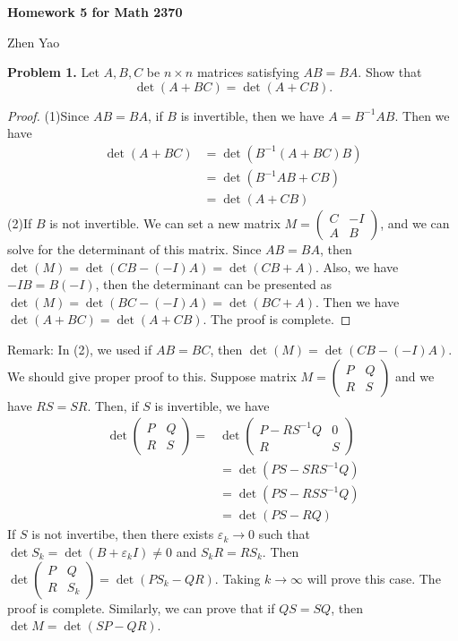 \documentclass[12pt,leqno]{amsart}
\begin{document}
\centerline{\bf Homework 5 for Math 2370}
\centerline{Zhen Yao}

\bigskip

\medskip

\noindent \textbf{Problem 1.} 
Let $A,B,C$ be $n\times n$ matrices satisfying $AB=BA$. Show that
$$
\det\left(  A+BC\right)  =\det\left(  A+CB\right).
$$
\begin{proof}
(1)Since $AB=BA$, if $B$ is invertible, then we have $A=B^{-1}AB$. Then we have
\begin{align*}
    \det (A+BC) &= \det (B^{-1}(A+BC)B) \\
    & = \det(B^{-1}AB+CB) \\
    & = \det(A+CB)
\end{align*}
\hspace*{3em}(2)If $B$ is not invertible. We can set a new matrix $M = \begin{pmatrix}
C & -I \\
A & B
\end{pmatrix}$, and we can solve for the determinant of this matrix. Since $AB=BA$, then $\det(M)=\det(CB-(-I)A)=\det(CB+A)$. Also, we have $-IB=B(-I)$, then the determinant can be presented as $\det (M)=\det(BC-(-I)A)=\det(BC+A)$. Then we have $\det(A+BC)=\det(A+CB)$. The proof is complete.
\end{proof}
\hspace*{2em}Remark: In (2), we used if $AB=BC$, then $\det(M)=\det(CB-(-I)A)$. We should give proper proof to this. Suppose matrix $M = \begin{pmatrix}
P & Q \\
R & S
\end{pmatrix}$ and we have $RS=SR$. Then, if $S$ is invertible, we have 
\begin{align*}
    \det \begin{pmatrix}
    P & Q \\
    R & S
    \end{pmatrix}
    = &\det 
    \begin{pmatrix}
    P-RS^{-1}Q & 0 \\
    R & S
    \end{pmatrix} \\
    & = \det(PS-SRS^{-1}Q) \\
    & = \det(PS-RSS^{-1}Q) \\
    & = \det(PS-RQ)
\end{align*}
If $S$ is not invertibe, then there exists $\varepsilon_k \rightarrow 0$ such that $\det S_k = \det(B+\varepsilon_k I) \neq 0$ and $S_k R = R S_k$. Then $\det \begin{pmatrix}
P & Q \\
R & S_k
\end{pmatrix} = \det (PS_k-QR)$. Taking $k\rightarrow \infty$ will prove this case. The proof is complete. Similarly, we can prove that if $QS=SQ$, then $\det M = \det(SP-QR)$.\\
\end{document}
